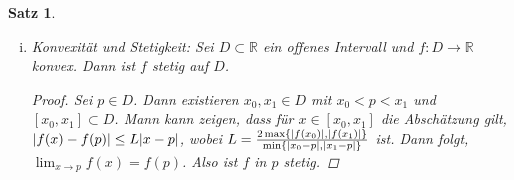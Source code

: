 \documentclass[ngerman,titlepage,twoside, parskip=half*]{scrreprt}
\newcommand*{\R}{\mathbb{R}}
\theoremstyle{break}
\newtheorem{theorem}{Satz}[section]
\theoremstyle{nonumberbreak}
\newtheorem{proof}{Beweis:}
\DeclarePairedDelimiter{\abs}{\lvert}{\rvert}
\begin{document}
\begin{theorem}
  \begin{enumerate}[(i)]
  \item \emph{Konvexität und Stetigkeit}: 
    Sei $D\subset\R$ ein offenes Intervall und $f\colon D\rightarrow\R$
    konvex. Dann ist $f$ stetig auf $D$.
    \begin{proof}
      Sei $p\in D$. Dann existieren $x_0, x_1\in D$ mit $x_0<p<x_1$
      und $[x_0,x_1]\subset D$. Mann kann zeigen, dass für
      $x\in[x_0,x_1]$ die Abschätzung gilt, $\abs{f(x)-f(p)}\leq
      L\abs{x-p}$, wobei $L= \frac{2\max\{\abs{f(x_0)},
        \abs{f(x_1)}\}}{\min\{\abs{x_0- p}, \abs{x_1-p}\}}$
      ist. Dann folgt, $\lim_{x\rightarrow p} f(x)=f(p)$. Also ist
      $f$ in $p$ stetig.
    \end{proof}
    

\end{enumerate}
\end{theorem}
\end{document}
